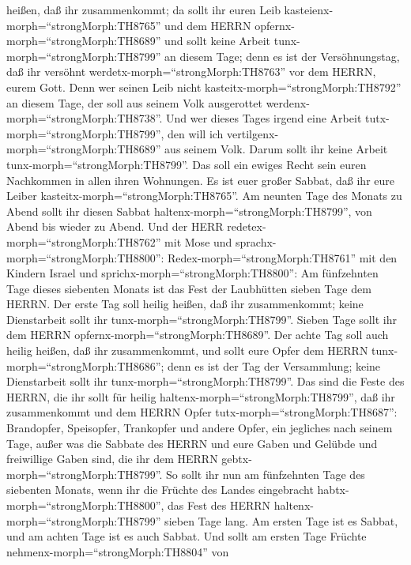 heißen, daß ihr zusammenkommt; da sollt ihr euren Leib
kasteienx-morph=``strongMorph:TH8765'' und dem HERRN
opfernx-morph=``strongMorph:TH8689''  und sollt keine
Arbeit tunx-morph=``strongMorph:TH8799'' an diesem Tage; denn es ist der
Versöhnungstag, daß ihr versöhnt werdetx-morph=``strongMorph:TH8763''
vor dem HERRN, eurem Gott.  Denn wer seinen Leib nicht
kasteitx-morph=``strongMorph:TH8792'' an diesem Tage, der soll aus
seinem Volk ausgerottet werdenx-morph=``strongMorph:TH8738''.
 Und wer dieses Tages irgend eine Arbeit
tutx-morph=``strongMorph:TH8799'', den will ich
vertilgenx-morph=``strongMorph:TH8689'' aus seinem Volk. 
Darum sollt ihr keine Arbeit tunx-morph=``strongMorph:TH8799''. Das soll
ein ewiges Recht sein euren Nachkommen in allen ihren Wohnungen.
 Es ist euer großer Sabbat, daß ihr eure Leiber
kasteitx-morph=``strongMorph:TH8765''. Am neunten Tage des Monats zu
Abend sollt ihr diesen Sabbat haltenx-morph=``strongMorph:TH8799'', von
Abend bis wieder zu Abend.  Und der HERR
redetex-morph=``strongMorph:TH8762'' mit Mose und
sprachx-morph=``strongMorph:TH8800'': 
Redex-morph=``strongMorph:TH8761'' mit den Kindern Israel und
sprichx-morph=``strongMorph:TH8800'': Am fünfzehnten Tage dieses
siebenten Monats ist das Fest der Laubhütten sieben Tage dem HERRN.
 Der erste Tag soll heilig heißen, daß ihr zusammenkommt;
keine Dienstarbeit sollt ihr tunx-morph=``strongMorph:TH8799''.
 Sieben Tage sollt ihr dem HERRN
opfernx-morph=``strongMorph:TH8689''. Der achte Tag soll auch heilig
heißen, daß ihr zusammenkommt, und sollt eure Opfer dem HERRN
tunx-morph=``strongMorph:TH8686''; denn es ist der Tag der Versammlung;
keine Dienstarbeit sollt ihr tunx-morph=``strongMorph:TH8799''.
 Das sind die Feste des HERRN, die ihr sollt für heilig
haltenx-morph=``strongMorph:TH8799'', daß ihr zusammenkommt und dem
HERRN Opfer tutx-morph=``strongMorph:TH8687'': Brandopfer, Speisopfer,
Trankopfer und andere Opfer, ein jegliches nach seinem Tage,
 außer was die Sabbate des HERRN und eure Gaben und Gelübde
und freiwillige Gaben sind, die ihr dem HERRN
gebtx-morph=``strongMorph:TH8799''.  So sollt ihr nun am
fünfzehnten Tage des siebenten Monats, wenn ihr die Früchte des Landes
eingebracht habtx-morph=``strongMorph:TH8800'', das Fest des HERRN
haltenx-morph=``strongMorph:TH8799'' sieben Tage lang. Am ersten Tage
ist es Sabbat, und am achten Tage ist es auch Sabbat.  Und
sollt am ersten Tage Früchte nehmenx-morph=``strongMorph:TH8804'' von
